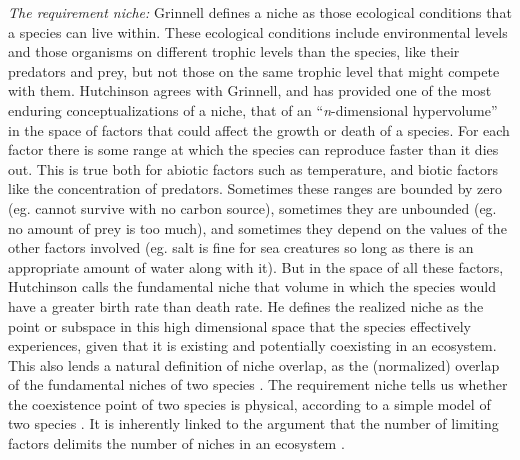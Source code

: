 \emph{The requirement niche:}
Grinnell \cite{Grinnell1917} defines a niche as those ecological conditions that a species can live within. 
These ecological conditions include environmental levels and those organisms on different trophic levels than the species, like their predators and prey, but not those on the same trophic level that might compete with them.
Hutchinson \cite{Hutchinson1961} agrees with Grinnell, and has provided one of the most enduring conceptualizations of a niche, that of an ``\emph{n}-dimensional hypervolume'' in the space of factors that could affect the growth or death of a species.
For each factor there is some range at which the species can reproduce faster than it dies out.
This is true both for abiotic factors such as temperature, and biotic factors like the concentration of predators.
Sometimes these ranges are bounded by zero (eg. cannot survive with no carbon source), sometimes they are unbounded (eg. no amount of prey is too much), and sometimes they depend on the values of the other factors involved (eg. salt is fine for sea creatures so long as there is an appropriate amount of water along with it). 
But in the space of all these factors, Hutchinson calls the fundamental niche that volume in which the species would have a greater birth rate than death rate. 
He defines the realized niche as the point or subspace in this high dimensional space that the species effectively experiences, given that it is existing and potentially coexisting in an ecosystem. 
This also lends a natural definition of niche overlap, as the (normalized) overlap of the fundamental niches of two species \cite{MacArthur1967}. 
The requirement niche tells us whether the coexistence point of two species is physical, according to a simple model of two species \cite{Holt1994}. 
It is inherently linked to the argument that the number of limiting factors delimits the number of niches in an ecosystem \cite{Armstrong1976,McGehee1977a,Armstrong1980}. 

